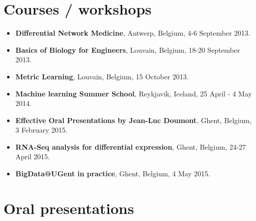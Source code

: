 \section{Courses / workshops}

\begin{itemize}
  \item \textbf{Differential Network Medicine}, Antwerp, Belgium, 4-6 September 2013.
  \item \textbf{Basics of Biology for Engineers}, Louvain, Belgium, 18-20 September 2013.
  \item \textbf{Metric Learning}, Louvain, Belgium, 15 October 2013.
  \item \textbf{Machine learning Summer School}, Reykjavik, Iceland, 25 April - 4 May 2014.
  \item \textbf{Effective Oral Presentations by Jean-Luc Doumont}, Ghent, Belgium, 3 February 2015.
  \item \textbf{RNA-Seq analysis for differential expression}, Ghent, Belgium, 24-27 April 2015.
  \item \textbf{BigData@UGent in practice}, Ghent, Belgium, 4 May 2015.
\end{itemize}

\section{Oral presentations}

